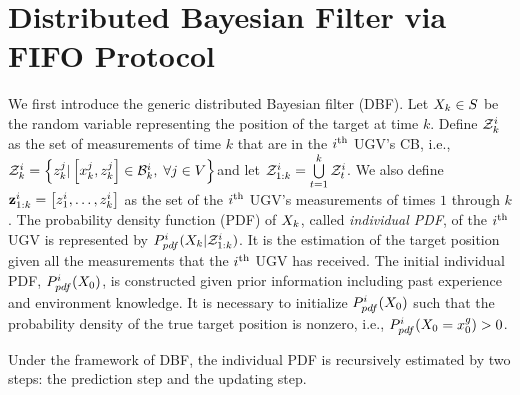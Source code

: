 \section{Distributed Bayesian Filter via FIFO Protocol}\label{sec:\proto-dbf}
	We first introduce the generic distributed Bayesian filter (DBF).
	Let $X_k\in S$ be the random variable representing the position of the target at time $k$.
	Define $\mathcal{Z}^i_k$ as the set of measurements of time $k$ that are in the $i^\text{th}$ UGV's CB, i.e., \small$\mathcal{Z}^i_k=\left\lbrace z^j_k| \left[x^j_k,z^j_k\right]\in \mathcal{B}^i_k,\; \forall j\in V\right\rbrace$\normalsize and let $\mathcal{Z}^i_{1:k} = \bigcup\limits_{t=1}^k \mathcal{Z}^i_t$. 
	We also define $\mathbf{z}^i_{1:k}=\left[z^i_1,\dots,z^i_k\right]$ as the set of the $i^\text{th}$ UGV's measurements of times $1$ through $k$.
	The probability density function (PDF) of $X_k$, called \textit{individual PDF}, of the $i^\text{th}$ UGV is represented by
	$P^i_{pdf}(X_{k}|\mathcal{Z}^i_{1:k})$.
	It is the estimation of the target position given all the measurements that the $i^\text{th}$ UGV has received.	
	The initial individual PDF, $P^i_{pdf}(X_0)$, is constructed %
	given prior information including past experience and environment knowledge. 
	It is necessary to initialize $P^i_{pdf}(X_0)$ such that the probability density of the true target position is nonzero, i.e., $P^i_{pdf}(X_0=x^g_0)> 0$.
	
	Under the framework of DBF, the individual PDF is recursively estimated by two steps: the prediction step and the updating step. 
	
